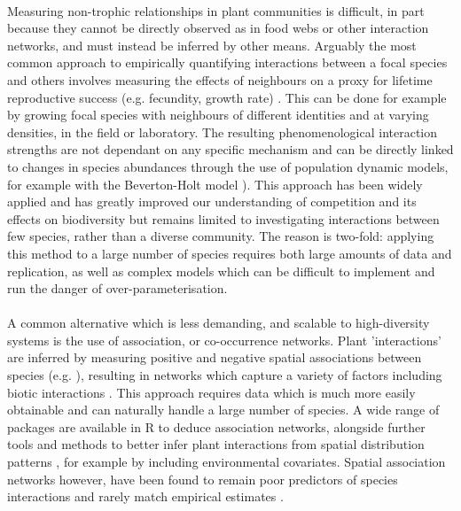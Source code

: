 \documentclass[a4,12pt]{article}
\begin{document}
    \paragraph{}
    Measuring non-trophic relationships in plant communities is difficult, in part because they cannot be directly observed as in food webs or other interaction networks, and must instead be inferred by other means. Arguably the most common approach to empirically quantifying interactions between a focal species and others involves measuring the effects of neighbours on a proxy for lifetime reproductive success (e.g. fecundity, growth rate) \parencite{Connell1961, Grace1990}. This can be done for example by growing focal species with neighbours of different identities and at varying densities, in the field or laboratory. The resulting phenomenological interaction strengths are not dependant on any specific mechanism and can be directly linked to changes in species abundances through the use of population dynamic models, for example with the Beverton-Holt model \parencite{Beverton1957, Levine2009}). This approach has been widely applied and has greatly improved our understanding of competition and its effects on biodiversity \parencite{Tilman1982, Chesson2000b, Levine2008, Adler2010, Mayfield2010a, Kraft2015} but remains limited to investigating interactions between few species, rather than a diverse community. The reason is two-fold: applying this method to a large number of species requires both large amounts of data and replication, as well as complex models which can be difficult to implement and run the danger of over-parameterisation. 

    \paragraph{} 
    A common alternative which is less demanding, and scalable to high-diversity systems is the use of association, or co-occurrence networks. Plant 'interactions' are inferred by measuring positive and negative spatial associations between species (e.g. \textcite{Saiz2011}), resulting in networks which capture a variety of factors including biotic interactions \parencite{Losapio2019}. This approach requires data which is much more easily obtainable and can naturally handle a large number of species. A wide range of packages are available in R to deduce association networks, alongside further tools and methods to better infer plant interactions from spatial distribution patterns \parencite{Keil2019}, for example by including environmental covariates. Spatial association networks however, have been found to remain poor predictors of species interactions and rarely match empirical estimates \parencite{Sander2017,Barner2018, Thurman2019, Blanchet2020}.
\end{document}
